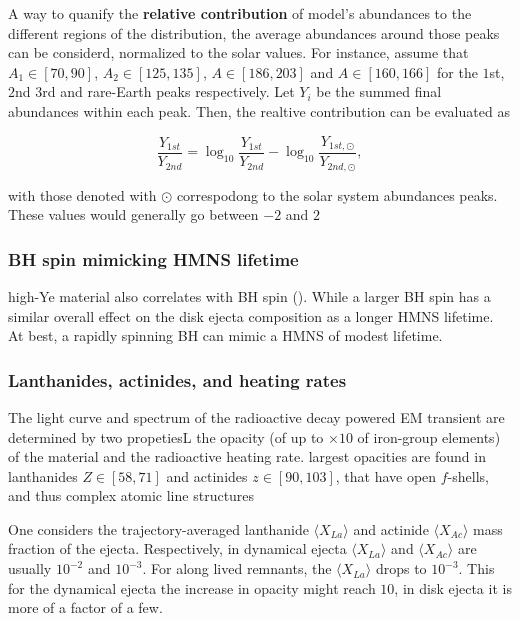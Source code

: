 A way to quanify the \textbf{relative contribution} of model's abundances to the different regions of the \rproc{} distribution, the average abundances around those peaks can be considerd, normalized to the solar values. 
For instance, assume that $A_1 \in [70,90]$, $A_2 \in [125,135]$, $A\in[186,203]$ and $A\in[160,166]$ for the $1$st, $2$nd $3$rd and rare-Earth peaks respectively. Let $Y_{i}$ be the summed final abundances within each peak. Then, the realtive contribution can be evaluated as 

\begin{equation}
\frac{Y_{1st}}{Y_{2nd}} = \log_{10}\frac{Y_{1st}}{Y_{2nd}} - \log_{10}\frac{Y_{1st,\odot}}{Y_{2nd,\odot}},
\end{equation}

with those denoted with $\odot$ correspodong to the solar system abundances peaks. 
These values would generally go between $-2$ and $2$ 


\subsubsection{BH spin mimicking HMNS lifetime}

high-Ye material also correlates with BH spin (\cite{Fernandez et al., 2015a}).
While a larger BH spin has a similar overall effect on the disk ejecta composition as a longer \ac{HMNS} lifetime.
At best, a rapidly spinning \ac{BH} can mimic a \ac{HMNS} of modest lifetime.


\subsubsection{Lanthanides, actinides, and heating rates}

The light curve and spectrum of the radioactive decay powered \ac{EM} transient are determined by two propetiesL the opacity (of up to $\times10$ of iron-group elements) of the material and the radioactive heating rate. largest opacities are found in lanthanides $Z\in[58,71]$ and actinides $z\in[90,103]$, that have open $f$-shells, and thus complex atomic line structures \cite{(Kasen et al., 2013; Tanaka and Hotokezaka, 2013; Fontes et al., 2015)}

One considers the trajectory-averaged lanthanide $\langle X_{La} \rangle$ and actinide $\langle X_{Ac} \rangle$ mass fraction of the ejecta. Respectively, in dynamical ejecta $\langle X_{La} \rangle$ and $\langle X_{Ac} \rangle$ are usually $10^{-2}$ and $10^{-3}$. For along lived remnants, the $\langle X_{La} \rangle$ drops to $10^{-3}$. This for the dynamical ejecta the increase in opacity might reach $10$, in disk ejecta it is more of a factor of a few. 

